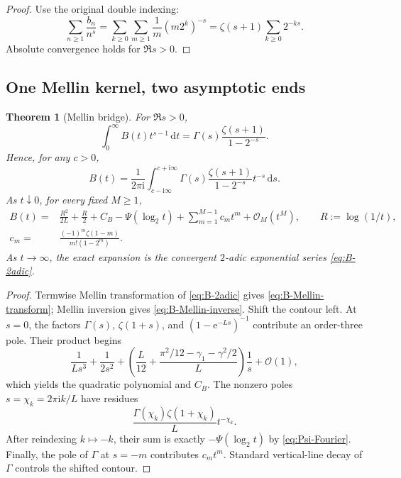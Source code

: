 \documentclass[11pt,oneside]{article}
\numberwithin{equation}{section}
\newtheorem{theorem}{Theorem}[section]
\theoremstyle{definition}
\theoremstyle{remark}
\newcommand{\e}{\mathrm e}
\newcommand{\ii}{\mathrm i}
\newcommand{\dd}{\,\mathrm d}
\newcommand{\bigO}{\mathcal O}
\begin{document}
\begin{proof}
Use the original double indexing:
\[
 \sum_{n\ge1}\frac{b_n}{n^s}
 =\sum_{k\ge0}\sum_{m\ge1}
   \frac1m(m2^k)^{-s}
 =\zeta(s+1)\sum_{k\ge0}2^{-ks}.
\]
Absolute convergence holds for $\Re s>0$.
\end{proof}

\subsection{One Mellin kernel, two asymptotic ends}

\begin{theorem}[Mellin bridge]
\label{thm:Mellin-bridge}
For $\Re s>0$,
\begin{equation}
 \int_0^\infty B(t)t^{s-1}\dd t
 =\Gamma(s)\frac{\zeta(s+1)}{1-2^{-s}}.
 \label{eq:B-Mellin-transform}
\end{equation}
Hence, for any $c>0$,
\begin{equation}
 B(t)=\frac1{2\pi\ii}\int_{c-\ii\infty}^{c+\ii\infty}
 \Gamma(s)\frac{\zeta(s+1)}{1-2^{-s}}t^{-s}\dd s.
 \label{eq:B-Mellin-inverse}
\end{equation}
As $t\downarrow0$, for every fixed $M\ge1$,
\begin{align}
 B(t)={}&\frac{R^2}{2L}+\frac R2+C_B-\Psi(\log_2t)
 +\sum_{m=1}^{M-1}c_mt^m+\bigO_M(t^M),
 \qquad R:=\log(1/t),
 \label{eq:B-small-t}\\
 c_m={}&\frac{(-1)^m\zeta(1-m)}{m!(1-2^m)}.
 \label{eq:cm}
\end{align}
As $t\to\infty$, the exact expansion is the convergent $2$-adic exponential
series \eqref{eq:B-2adic}.
\end{theorem}

\begin{proof}
Termwise Mellin transformation of \eqref{eq:B-2adic} gives
\eqref{eq:B-Mellin-transform}; Mellin inversion gives
\eqref{eq:B-Mellin-inverse}.  Shift the contour left.  At $s=0$, the factors
$\Gamma(s)$, $\zeta(1+s)$, and $(1-\e^{-Ls})^{-1}$ contribute an order-three
pole.  Their product begins
\[
 \frac1{Ls^3}+\frac1{2s^2}
 +\left(\frac L{12}
 +\frac{\pi^2/12-\gamma_1-\gamma^2/2}{L}\right)\frac1s
 +\bigO(1),
\]
which yields the quadratic polynomial and $C_B$.  The nonzero poles
$s=\chi_k=2\pi\ii k/L$ have residues
\[
 \frac{\Gamma(\chi_k)\zeta(1+\chi_k)}L t^{-\chi_k}.
\]
After reindexing $k\mapsto-k$, their sum is exactly
$-\Psi(\log_2t)$ by \eqref{eq:Psi-Fourier}.  Finally, the pole of $\Gamma$ at
$s=-m$ contributes $c_mt^m$.  Standard vertical-line decay of $\Gamma$
controls the shifted contour.
\end{proof}
\end{document}
